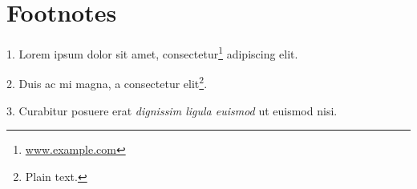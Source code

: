 \section{Footnotes}
1. Lorem ipsum dolor sit amet, consectetur\footnote{ \url{www.example.com}} adipiscing elit.

2. Duis ac mi magna, a consectetur elit\footnote{ Plain text.}.

3. Curabitur posuere erat \emph{dignissim ligula euismod} ut euismod nisi.

